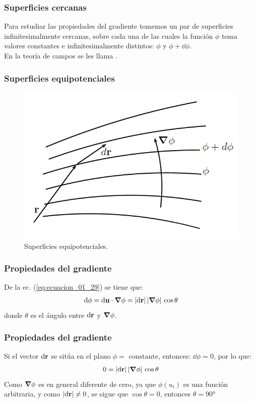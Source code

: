 \documentclass[12pt]{beamer}
\begin{document}
\begin{frame}
\frametitle{Superficies cercanas}
Para estudiar las propiedades del gradiente tomemos un par de superficies infinitesimalmente cercanas, sobre cada una de las cuales la función $\phi$ toma valores constantes e infinitesimalmente distintos: $\phi$ y $\phi + \dd{\phi}$.
\\
\bigskip
\pause
En la teoría de campos se les llama .
\end{frame}
\begin{frame}
\frametitle{Superficies equipotenciales}
\begin{figure}[h!]
    \centering
    \includegraphics[scale=0.5]{Imagenes/Superficies_Equipotenciales.png}
    \caption{Superficies equipotenciales.}
    \label{fig:Superficies_Equipotenciales}
\end{figure}
\end{frame}
\begin{frame}
\frametitle{Propiedades del gradiente}
De la ec. (\ref{eq:ecuacion_01_29}) se tiene que:
\pause
\begin{align*}
\dd{\phi} = \dd{\vb{u}} \cdot \grad{\phi} = \abs{\dd{\vb{r}}} \, \abs{\grad{\phi}} \, \cos \theta
\end{align*}
donde $\theta$ es el ángulo entre $\dd{\vb{r}}$ y $\grad{\phi}$.
\end{frame}
\begin{frame}
\frametitle{Propiedades del gradiente}
Si el vector $\dd{\vb{r}}$ se sitúa en el plano $\phi = \mbox{ constante}$, entonces: $\dd{\phi} = 0$, por lo que:
\pause
\begin{align*}
0 = \abs{\dd{\vb{r}}} \, \abs{\grad{\phi}} \, \cos \theta
\end{align*}
\pause
Como $\grad{\phi}$ es en general diferente de cero, ya que $\phi(u_{i})$ es una función arbitraria, y como $\abs{\dd{\vb{r}}} \neq 0$, se sigue que $\cos \theta = 0$, entonces $\theta = \ang{90}$
\end{frame}
\end{document}
